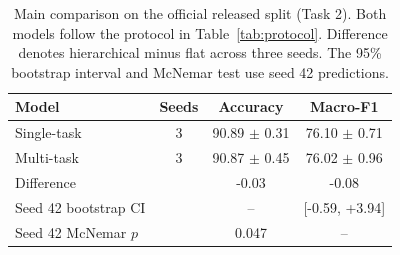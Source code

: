 \begin{table}[t]
\caption{Main comparison on the official released split (Task 2). Both models follow the protocol in Table~\ref{tab:protocol}. Difference denotes hierarchical minus flat across three seeds. The 95\% bootstrap interval and McNemar test use seed 42 predictions.}
\label{tab:main}
\centering
\small
\begin{tabular}{@{}lccc@{}}
\toprule
Model & Seeds & Accuracy & Macro-F1 \\
\midrule
Single-task \phobert{} & 3 & 90.89 $\pm$ 0.31 & 76.10 $\pm$ 0.71 \\
Multi-task \phobert{} & 3 & 90.87 $\pm$ 0.45 & 76.02 $\pm$ 0.96 \\
\midrule
Difference & & -0.03 & -0.08 \\
Seed 42 bootstrap CI & & -- & [-0.59, +3.94] \\
Seed 42 McNemar $p$ & & 0.047 & -- \\

\bottomrule
\end{tabular}
\end{table}
